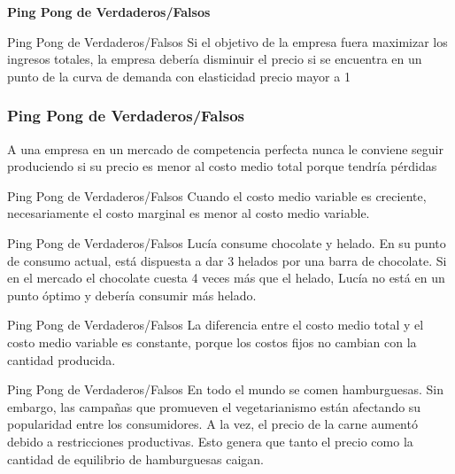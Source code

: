 \documentclass{beamer}
\begin{document}
\begin{frame}
    \centering
    \begin{boxB}
    \centering \Large \textbf{Ping Pong de Verdaderos/Falsos} \\   
    \end{boxB}
\end{frame}

\begin{frame}{Ping Pong de Verdaderos/Falsos}
    \centering
    Si el objetivo de la empresa fuera maximizar los ingresos totales, la empresa debería disminuir el precio si se encuentra en un punto de la curva de demanda con elasticidad precio mayor a 1
\end{frame}

\begin{frame}
\frametitle{Ping Pong de Verdaderos/Falsos}
\centering
A una empresa en un mercado de competencia perfecta nunca le conviene seguir produciendo si su precio es menor al costo medio total porque tendría pérdidas
\end{frame}

\begin{frame}{Ping Pong de Verdaderos/Falsos}
    \centering
    Cuando el costo medio variable es creciente, necesariamente el costo marginal es menor al costo medio variable.
\end{frame}

\begin{frame}{Ping Pong de Verdaderos/Falsos}
    \centering
    Lucía consume chocolate y helado. En su punto de consumo actual, está dispuesta a dar 3 helados por una barra de chocolate. Si en el mercado el chocolate cuesta 4 veces más que el helado, Lucía no está en un punto óptimo y debería consumir más helado.
\end{frame}

\begin{frame}{Ping Pong de Verdaderos/Falsos}
    \centering
    La diferencia entre el costo medio total y el costo medio variable es constante, porque los costos fijos no cambian con la cantidad producida.
\end{frame}

\begin{frame}{Ping Pong de Verdaderos/Falsos}
    \centering
    En todo el mundo se comen hamburguesas. Sin embargo, las campañas que promueven el vegetarianismo están afectando su popularidad entre los consumidores. A la vez, el precio de la carne aumentó debido a restricciones productivas. Esto genera que tanto el precio como la cantidad de equilibrio de hamburguesas caigan. 
\end{frame}
\end{document}
